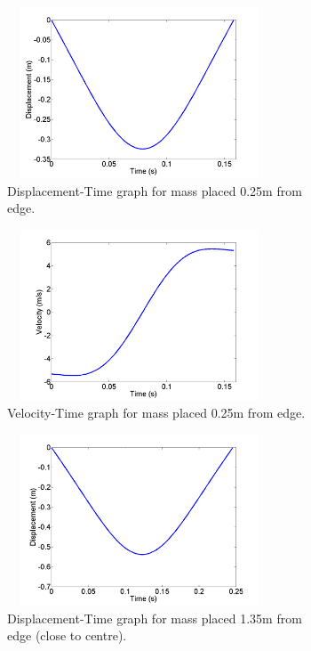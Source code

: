 \begin{figure}[H]
 	\centering
	\begin{subfigure}[t]{0.45\textwidth}
		\centering
		\includegraphics[width=3.1in, height=2in]{Disp_m1_144m_025fe.png}
		\caption{Displacement-Time graph for mass placed 0.25m from edge.}\label{fig:displace1}
	\end{subfigure}\hfill
	\begin{subfigure}[t]{0.45\textwidth}
    	\centering
		\includegraphics[width=3.1in, height=2in]{Vel_m1_144m_025fe.png}
		\caption{Velocity-Time graph for mass placed 0.25m from edge.}\label{fig:vel1}
	\end{subfigure}\hfill
     \begin{subfigure}{0.45\textwidth}
		\includegraphics[width=3.1in, height=2in]{Disp_m1_144m_135fe.png}
    	\caption{Displacement-Time graph for mass placed 1.35m from edge (close to centre).}\label{fig:displace2}
    \end{subfigure}\hfill
	\begin{subfigure}{0.45\textwidth}

\end{subfigure}
\end{figure}
